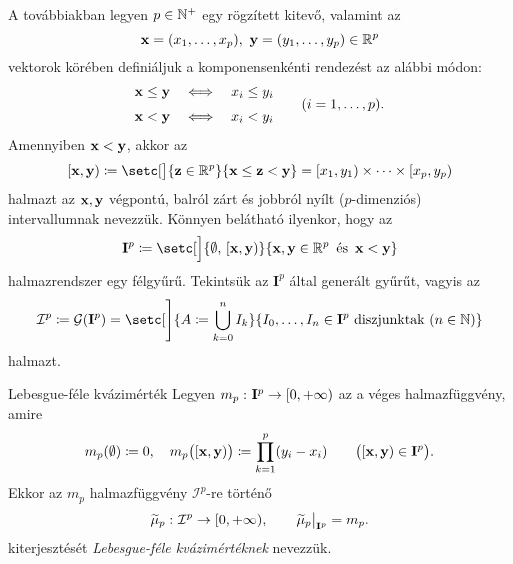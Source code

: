 \documentclass[
]{elteikthesis}[2024/04/26]
\begin{document}
	A továbbiakban legyen \( p \in \mathbb{N}^+ \) egy rögzített kitevő, valamint az
	\[
		\vb{x} = (x_1, \dots, x_p), \ \vb{y} = (y_1, \dots, y_p) \in \mathbb{R}^p
	\]
	vektorok körében definiáljuk a komponensenkénti rendezést az alábbi módon:
	\[
		\begin{alignedat}{3}
			\x &\leq \y \quad &&\ratio \Longleftrightarrow \quad x_i &&\leq y_i \\[3pt]
			\x &<    \y \quad &&\ratio \Longleftrightarrow \quad x_i &&<    y_i
		\end{alignedat}
		\qquad (i = 1,\dots, p).
	\]
	Amennyiben \( \vb{x} < \vb{y} \), akkor az
	\[
		[\x, \y) \coloneq 
		\setc[\big]{ \vb{z} \in \R^p }{ \x \leq \vb{z} < \y } =
		[ x_1, y_1 ) \times \cdots \times [x_p, y_p )
	\]
	halmazt az \( \vb{x}, \vb{y} \) végpontú, balról zárt és jobbról nyílt (\( p \)-dimenziós) intervallumnak nevezzük. Könnyen belátható ilyenkor, hogy az
	\[
		\mathbf{I}^p \coloneq 
		\setc[\Big]{ \emptyset,\, [\x, \y) }{ \x, \y \in \R^p \,\text{ és }\, \x < \y }
	\]
	halmazrendszer egy félgyűrű. Tekintsük az \( \mathbf{I}^p \) által generált gyűrűt, vagyis az
	\[
		\mathcal{I}^p \coloneq 
		\mathcal{G}( \mathbf{I}^p ) =
		\setc[\Bigg]{ A \coloneq \bigcup_{k=0}^n I_k }
					{ I_0, \dots, I_n \in \mathbf{I}^p \text{ diszjunktak } (n \in \N) }
	\]
	halmazt.
	
	\begin{definition}{Lebesgue-féle kvázimérték}{}
		Legyen \( m_p  \,\colon  \mathbf{I}^p  \to [0, +\infty) \) az a véges halmazfüggvény, amire
		\[
			m_p( \emptyset ) \coloneq 0, \quad
			m_p \bigl( [\vb{x}, \vb{y}) \bigr) \coloneq \prod_{k=1}^{p} (y_i - x_i) 
			\qquad \bigl( [\vb{x}, \vb{y}) \in \mathbf{I}^p \bigr).
		\]
		Ekkor az \( m_p \) halmazfüggvény \( \mathcal{I}^p \)-re történő
		\[
			\func{ \widetilde{\mu}_p }{ \mathcal{I}^p }{[0, +\infty)}, \qquad
			\restr{ \widetilde{\mu}_p }{ \mathbf{I}^p } = m_p.
		\]
		kiterjesztését \emph{Lebesgue-féle kvázimértéknek} nevezzük.
	\end{definition}
\end{document}
